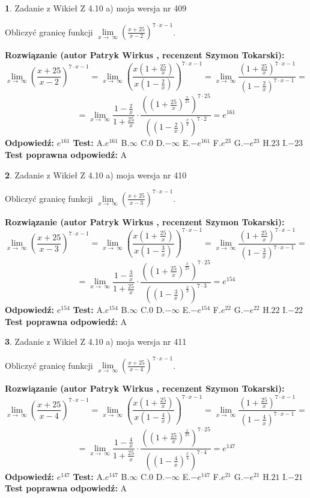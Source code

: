 \documentclass[12pt, a4paper]{article}
\theoremstyle{definition} %
\newtheorem{zad}{}
\newcommand{\zadStart}[1]{\begin{zad}#1\newline}
\newcommand{\zadStop}{\end{zad}}
\newcommand{\rozwStart}[2]{\noindent \textbf{Rozwiązanie (autor #1 , recenzent #2): }\newline}
\newcommand{\rozwStop}{\newline}
\newcommand{\odpStart}{\noindent \textbf{Odpowiedź:}\newline}
\newcommand{\odpStop}{\newline}
\newcommand{\testStart}{\noindent \textbf{Test:}\newline}
\newcommand{\testStop}{\newline}
\newcommand{\kluczStart}{\noindent \textbf{Test poprawna odpowiedź:}\newline}
\newcommand{\kluczStop}{\newline}
\begin{document}
\zadStart{Zadanie z Wikieł Z 4.10 a) moja wersja nr 409}

Obliczyć granicę funkcji  $\lim\limits_{x\to\ \infty}(\frac{x+25}{x-2})^{7\cdot x-1}$.
\zadStop
\rozwStart{Patryk Wirkus}{Szymon Tokarski}
$$\lim\limits_{x\to\ \infty}(\frac{x+25}{x-2})^{7\cdot x-1} = \lim\limits_{x\to\ \infty}(\frac{x(1+\frac{25}{x})}{x(1-\frac{2}{x})})^{7\cdot x-1}=\lim\limits_{x\to\ \infty}\frac{(1+\frac{25}{x})^{7\cdot x-1}}{(1-\frac{2}{x})^{7\cdot x-1}}=$$
$$=\lim\limits_{x\to\ \infty}\frac{1-\frac{2}{x}}{1+\frac{25}{x}}\cdot\frac{((1+\frac{25}{x})^{\frac{x}{25}})^{7\cdot25}}{((1-\frac{2}{x})^{\frac{x}{2}})^{7\cdot2}}=e^{161}$$
\rozwStop
\odpStart
$e^{161}$
\odpStop
\testStart
A.$e^{161}$ B.$\infty$ C.$0$ D.$-\infty$ E.$-e^{161}$
F.$e^{23}$ G.$-e^{23}$
H.$23$
I.$-23$
\testStop
\kluczStart
A
\kluczStop



\zadStart{Zadanie z Wikieł Z 4.10 a) moja wersja nr 410}

Obliczyć granicę funkcji  $\lim\limits_{x\to\ \infty}(\frac{x+25}{x-3})^{7\cdot x-1}$.
\zadStop
\rozwStart{Patryk Wirkus}{Szymon Tokarski}
$$\lim\limits_{x\to\ \infty}(\frac{x+25}{x-3})^{7\cdot x-1} = \lim\limits_{x\to\ \infty}(\frac{x(1+\frac{25}{x})}{x(1-\frac{3}{x})})^{7\cdot x-1}=\lim\limits_{x\to\ \infty}\frac{(1+\frac{25}{x})^{7\cdot x-1}}{(1-\frac{3}{x})^{7\cdot x-1}}=$$
$$=\lim\limits_{x\to\ \infty}\frac{1-\frac{3}{x}}{1+\frac{25}{x}}\cdot\frac{((1+\frac{25}{x})^{\frac{x}{25}})^{7\cdot25}}{((1-\frac{3}{x})^{\frac{x}{3}})^{7\cdot3}}=e^{154}$$
\rozwStop
\odpStart
$e^{154}$
\odpStop
\testStart
A.$e^{154}$ B.$\infty$ C.$0$ D.$-\infty$ E.$-e^{154}$
F.$e^{22}$ G.$-e^{22}$
H.$22$
I.$-22$
\testStop
\kluczStart
A
\kluczStop



\zadStart{Zadanie z Wikieł Z 4.10 a) moja wersja nr 411}

Obliczyć granicę funkcji  $\lim\limits_{x\to\ \infty}(\frac{x+25}{x-4})^{7\cdot x-1}$.
\zadStop
\rozwStart{Patryk Wirkus}{Szymon Tokarski}
$$\lim\limits_{x\to\ \infty}(\frac{x+25}{x-4})^{7\cdot x-1} = \lim\limits_{x\to\ \infty}(\frac{x(1+\frac{25}{x})}{x(1-\frac{4}{x})})^{7\cdot x-1}=\lim\limits_{x\to\ \infty}\frac{(1+\frac{25}{x})^{7\cdot x-1}}{(1-\frac{4}{x})^{7\cdot x-1}}=$$
$$=\lim\limits_{x\to\ \infty}\frac{1-\frac{4}{x}}{1+\frac{25}{x}}\cdot\frac{((1+\frac{25}{x})^{\frac{x}{25}})^{7\cdot25}}{((1-\frac{4}{x})^{\frac{x}{4}})^{7\cdot4}}=e^{147}$$
\rozwStop
\odpStart
$e^{147}$
\odpStop
\testStart
A.$e^{147}$ B.$\infty$ C.$0$ D.$-\infty$ E.$-e^{147}$
F.$e^{21}$ G.$-e^{21}$
H.$21$
I.$-21$
\testStop
\kluczStart
A
\kluczStop
\end{document}

